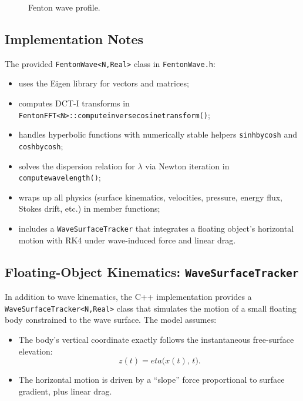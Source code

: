 \documentclass[journal,10pt,twocolumn]{IEEEtran}
\def\eta{eta}%
\def\_{}%
\begin{document}
    \begin{figure}[!t]
        \centering
        \resizebox{\linewidth}{!}{}
        \caption{Fenton wave profile.}
        \label{fig:waveProfile}
    \end{figure}

    \subsection{Implementation Notes}

    The provided \texttt{FentonWave<N,Real>} class in \texttt{FentonWave.h}:
    \begin{itemize}[leftmargin=1.4em]
        \item uses the Eigen library for vectors and matrices;
        \item computes DCT-I transforms in \texttt{FentonFFT<N>::compute\_inverse\_cosine\_transform()};
        \item handles hyperbolic functions with numerically stable helpers \texttt{sinh\_by\_cosh} and \texttt{cosh\_by\_cosh};
        \item solves the dispersion relation for $\lambda$ via Newton iteration in \texttt{compute\_wavelength()};
        \item wraps up all physics (surface kinematics, velocities, pressure, energy flux, Stokes drift, etc.) in member functions;
        \item includes a \texttt{WaveSurfaceTracker} that integrates a floating object's horizontal motion with RK4 under wave-induced force and linear drag.
    \end{itemize}

    \subsection{Floating-Object Kinematics: \texttt{WaveSurfaceTracker}}
    \label{sec:wave_surface_tracker}

    In addition to wave kinematics, the C++ implementation provides a \texttt{WaveSurfaceTracker<N,Real>} class that simulates the motion of a small floating body constrained to the wave surface. The model assumes:
    \begin{itemize}[leftmargin=1.4em]
        \item The body's vertical coordinate exactly follows the instantaneous free-surface elevation:
        \[
            z(t) = \eta\bigl(x(t),\,t\bigr).
        \]
        \item The horizontal motion is driven by a ``slope'' force proportional to surface gradient, plus linear drag.
    \end{itemize}
\end{document}
